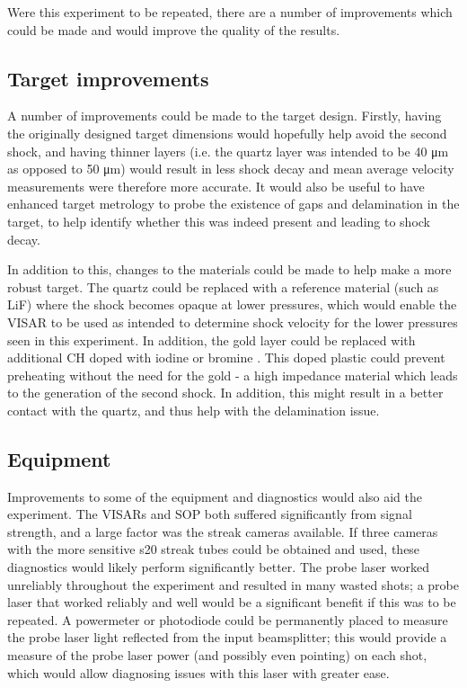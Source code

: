 Were this experiment to be repeated, there are a number of improvements which could be made and would improve the quality of the results.

\subsection{Target improvements}
A number of improvements could be made to the target design. Firstly, having the originally designed target dimensions would hopefully help avoid the second shock, and having thinner layers (i.e. the quartz layer was intended to be 40 \unit{\micro\meter} as opposed to 50 \unit{\micro\meter}) would result in less shock decay and mean average velocity measurements were therefore more accurate. It would also be useful to have enhanced target metrology to probe the existence of gaps and delamination in the target, to help identify whether this was indeed present and leading to shock decay.

In addition to this, changes to the materials could be made to help make a more robust target. The quartz could be replaced with a reference material (such as LiF) where the shock becomes opaque at lower pressures, which would enable the VISAR to be used as intended to determine shock velocity for the lower pressures seen in this experiment. In addition, the gold layer could be replaced with additional CH doped with iodine or bromine \cite{Desjardins2021}. This doped plastic could prevent preheating without the need for the gold - a high impedance material which leads to the generation of the second shock. In addition, this might result in a better contact with the quartz, and thus help with the delamination issue.

\subsection{Equipment}
Improvements to some of the equipment and diagnostics would also aid the experiment. The VISARs and SOP both suffered significantly from signal strength, and a large factor was the streak cameras available. If three cameras with the more sensitive s20 streak tubes could be obtained and used, these diagnostics would likely perform significantly better. The probe laser worked unreliably throughout the experiment and resulted in many wasted shots; a probe laser that worked reliably and well would be a significant benefit if this was to be repeated. A powermeter or photodiode could be permanently placed to measure the probe laser light reflected from the input beamsplitter; this would provide a measure of the probe laser power (and possibly even pointing) on each shot, which would allow diagnosing issues with this laser with greater ease.

